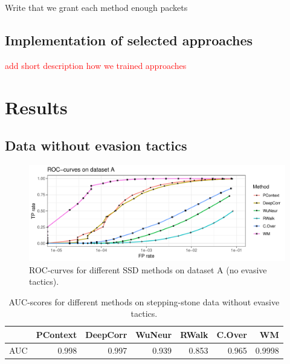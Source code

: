 \documentclass[runningheads]{llncs}\usepackage[]{graphicx}\usepackage[]{color}
\makeatletter
\def\maxwidth{ %
  \ifdim\Gin@nat@width>\linewidth
    \linewidth
  \else
    \Gin@nat@width
  \fi
}
\newenvironment{knitrout}{}{} %
\makeatother
\begin{document}
Write that we grant each method enough packets

\subsection{Implementation of selected approaches}

\textcolor{red}{add short description how we trained approaches}

\section{Results}\label{Sec:Results}


\subsection{Data without evasion tactics}

\begin{knitrout}
\color{fgcolor}\begin{figure}
\includegraphics[width=\maxwidth]{figure/Noevasion_4nodes-1} \caption[ROC-curves for different SSD methods on dataset A (no evasive tactics)]{ROC-curves for different SSD methods on dataset A (no evasive tactics).}\label{fig:Noevasion_4nodes}
\end{figure}


\end{knitrout}

\begin{table}
\centering
\begin{tabular}{l|r|r|r|r|r|r}
  \hline
 & PContext & DeepCorr & WuNeur & RWalk & C.Over & WM \\ 
  \hline
AUC & 0.998 & 0.997 & 0.939 & 0.853 & 0.965 & 0.9998 \\ 
   \hline
\end{tabular}

\caption{AUC-scores for different methods on stepping-stone data without evasive tactics.}\label{Tab:dfAUC}
\end{table}
\end{document}
